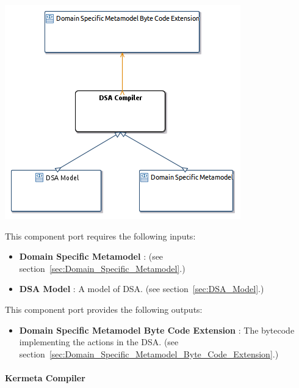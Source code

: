 \documentclass{gemoc} %
\begin{document}
\begin{center}
\includegraphics*[trim=0.0cm 0.0cm 0cm 0.0cm, clip=true]{../images/generated/Generated_DSA_Compiler.png}
\end{center}

This component port requires the following inputs:
\begin{itemize}
  \item \textbf{Domain Specific Metamodel} :
(see section~\ref{sec:Domain_Specific_Metamodel}.)
  \item \textbf{DSA Model} :
A model of DSA.
(see section~\ref{sec:DSA_Model}.)
\end{itemize}

This component port provides the following outputs:
\begin{itemize}
  \item \textbf{Domain Specific Metamodel Byte Code Extension} :
The bytecode implementing the actions in the DSA.
(see section~\ref{sec:Domain_Specific_Metamodel_Byte_Code_Extension}.)
\end{itemize}

\paragraph{Kermeta Compiler}
\label{sec:Kermeta_Compiler}
\end{document}
